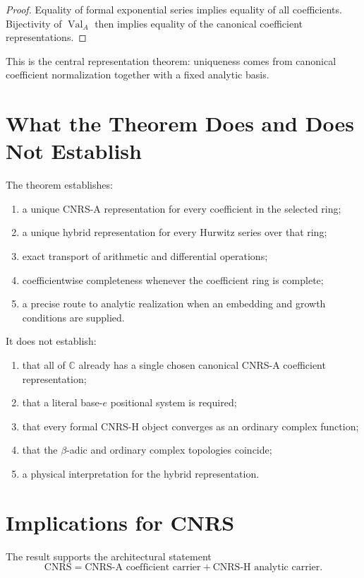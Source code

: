 \documentclass[11pt]{article}
\newcommand{\C}{\mathbb C}
\newcommand{\Val}{\operatorname{Val}_A}
\begin{document}
\begin{proof}
Equality of formal exponential series implies equality of all coefficients.  Bijectivity of $\Val$ then implies equality of the canonical coefficient representations.
\end{proof}

This is the central representation theorem: uniqueness comes from canonical coefficient normalization together with a fixed analytic basis.

\section{What the Theorem Does and Does Not Establish}

The theorem establishes:
\begin{enumerate}
\item a unique CNRS-A representation for every coefficient in the selected ring;
\item a unique hybrid representation for every Hurwitz series over that ring;
\item exact transport of arithmetic and differential operations;
\item coefficientwise completeness whenever the coefficient ring is complete;
\item a precise route to analytic realization when an embedding and growth conditions are supplied.
\end{enumerate}

It does not establish:
\begin{enumerate}
\item that all of $\C$ already has a single chosen canonical CNRS-A coefficient representation;
\item that a literal base-$e$ positional system is required;
\item that every formal CNRS-H object converges as an ordinary complex function;
\item that the $\beta$-adic and ordinary complex topologies coincide;
\item a physical interpretation for the hybrid representation.
\end{enumerate}

\section{Implications for CNRS}

The result supports the architectural statement
\[
\boxed{
\text{CNRS}
=
\text{CNRS-A coefficient carrier}
+
\text{CNRS-H analytic carrier}.
}
\]
\end{document}
